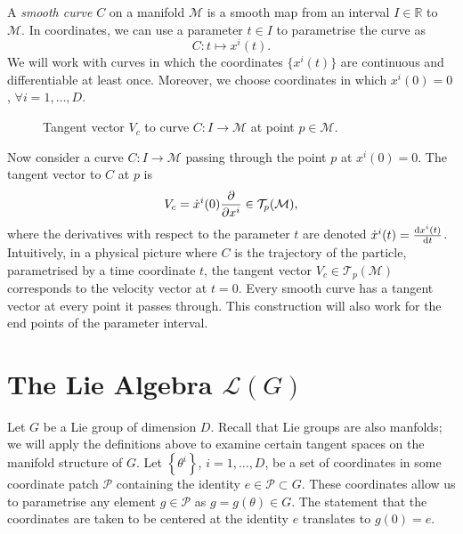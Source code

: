 
\begin{definition}
  A \emph{smooth curve} $C$ on a manifold $\mathcal{M}$ is a smooth map from an interval $I \in \mathbb{R}$ to $\mathcal{M}$.
  In coordinates, we can use a parameter $t \in I$ to parametrise the curve as
  \begin{equation}
    C: t \mapsto x^i(t).
  \end{equation}
  We will work with curves in which the coordinates $\{ x^i (t) \}$ are continuous and differentiable at least once.
  Moreover, we choose coordinates in which $x^i(0) = 0$, $\forall i = 1, \ldots, D$.
\end{definition}

\begin{figure}[htpb]
  \centering
  \def\svgwidth{0.3\columnwidth}
  
  \caption{Tangent vector $V_c$ to curve $C: I \to \mathcal{M}$ at point $p \in \mathcal{M}$.}
  \label{fig:tangentcurve}
\end{figure}
Now consider a curve $C: I \to \mathcal{M}$ passing through the point $p$ at $x^i(0) = 0$. The tangent vector to $C$ at $p$ is
\begin{equation}
  V_c = \dot x^i(0) \pdv{}{x^i} \in \mathcal{T}_p (\mathcal{M}),
\end{equation}
where the derivatives with respect to the parameter $t$ are denoted $\dot x^i(t) = \dv{x^i(t)}{t}$.
Intuitively, in a physical picture where $C$ is the trajectory of the particle, parametrised by a time coordinate $t$, the tangent vector $V_c \in \mathcal{T}_p(\mathcal{M})$ corresponds to the velocity vector at $t = 0$.
Every smooth curve has a tangent vector at every point it passes through.
This construction will also work for the end points of the parameter interval.

\section{The Lie Algebra \texorpdfstring{$\mathscr{L}(G)$}{of group G}}%
\label{sec:the_lie_algebra_of_G}

Let $G$ be a Lie group of dimension $D$. Recall that Lie groups are also manfolds; we will apply the definitions above to examine certain tangent spaces on the manifold structure of $G$. Let $\left\{ \theta^i \right\}$, $i = 1, \ldots, D$, be a set of coordinates in some coordinate patch $\mathcal{P}$ containing the identity $e \in \mathcal{P} \subset G$.
These coordinates allow us to parametrise any element $g \in \mathcal{P}$ as $g = g(\theta) \in G$. The statement that the coordinates are taken to be centered at the identity $e$ translates to $g(0) = e$.

